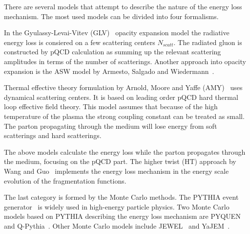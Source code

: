 There are several models that attempt to describe the nature of the energy loss mechanism. The most used models can be divided into four formalisms.
%

In the Gyulassy-Levai-Vitev (GLV)~\cite{Gyulassy:1999zd} opacity expansion model
 the radiative energy loss is consiered on a few scattering centers $N_{scatt}$. The radiated gluon is constructed by pQCD calculation as summing up the relevant scattering amplitudes in terms of the number of scatterings. Another approach into opacity expansion is the ASW model by Armesto, Salgado and Wiedermann~\cite{Wiedemann:2000za}.

Thermal effective theory formulation by Arnold, Moore and Yaffe (AMY)~\cite{Arnold:2001ms} uses dynamical scattering centers. It is based on leading order pQCD hard thermal loop effective field theory. This model assumes that because of the high temperature of the plasma the strong coupling constant can be treated as small. The parton propagating through the medium will lose energy from soft scatterings and hard scatterings.

The above models calculate the energy loss while the parton propagates through the medium, focusing on the pQCD part. The higher twist (HT) approach by Wang and Guo~\cite{Wang:2001ifa} implements the energy loss mechanism in the energy scale evolution of the fragmentation functions.

The last category is formed by the Monte Carlo methods. The PYTHIA event generator~\cite{pythia} is widely used in high-energy particle physics. Two Monte Carlo models based on PYTHIA describing the energy loss mechanism are PYQUEN~\cite{Lokhtin:2005px} and Q-Pythia~\cite{Armesto:2009zc}. Other Monte Carlo models include JEWEL~\cite{Zapp:2008gi} and YaJEM~\cite{Renk:2009nz}.

